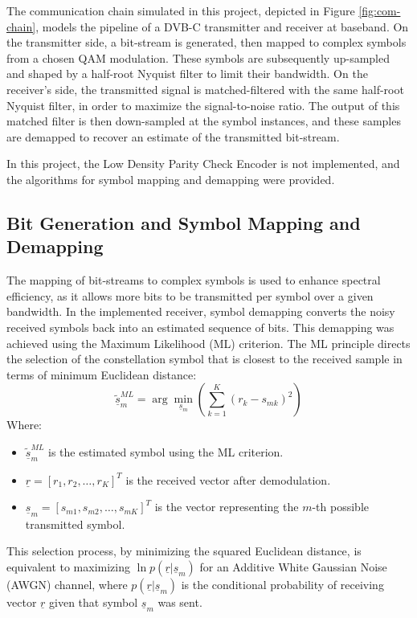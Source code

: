 The communication chain simulated in this project, depicted in Figure \ref{fig:com-chain}, models the pipeline of a DVB-C transmitter and receiver at baseband. On the transmitter side, a bit-stream is generated, then mapped to complex symbols from a chosen QAM modulation. These symbols are subsequently up-sampled and shaped by a half-root Nyquist filter to limit their bandwidth. On the receiver's side, the transmitted signal is matched-filtered with the same half-root Nyquist filter, in order to maximize the signal-to-noise ratio. The output of this matched filter is then down-sampled at the symbol instances, and these samples are demapped to recover an estimate of the transmitted bit-stream.
\par
In this project, the Low Density Parity Check Encoder is not implemented, and the algorithms for symbol mapping and demapping were provided.

\subsection{Bit Generation and Symbol Mapping and Demapping}
The mapping of bit-streams to complex symbols is used to enhance spectral efficiency, as it allows more bits to be transmitted per symbol over a given bandwidth. In the implemented receiver, symbol demapping converts the noisy received symbols back into an estimated sequence of bits. This demapping was achieved using the Maximum Likelihood (ML) criterion. The ML principle directs the selection of the constellation symbol that is closest to the received sample in terms of minimum Euclidean distance:
\begin{equation}
	\tilde{\underline{s}}_{m}^{ML} = \arg\min_{\underline{s}_{m}} \left(\sum_{k=1}^{K}(r_{k}-s_{mk})^{2}\right)
\end{equation}
Where:
\begin{itemize}
	\item $\tilde{\underline{s}}_{m}^{ML}$ is the estimated symbol using the ML criterion.
	\item $\underline{r} = [r_1, r_2, \dots, r_K]^T$ is the received vector after demodulation.
	\item $\underline{s}_{m} = [s_{m1}, s_{m2}, \dots, s_{mK}]^T$ is the vector representing the $m$-th possible transmitted symbol.
\end{itemize}
This selection process, by minimizing the squared Euclidean distance, is equivalent to maximizing $\ln p(\underline{r}|\underline{s}_{m})$ for an Additive White Gaussian Noise (AWGN) channel, where $p(\underline{r}|\underline{s}_{m})$ is the conditional probability of receiving vector $\underline{r}$ given that symbol $\underline{s}_m$ was sent.

